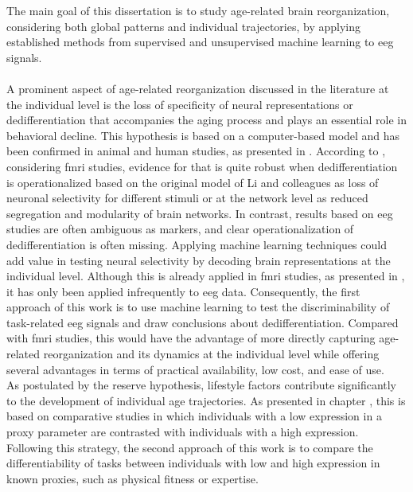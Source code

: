 The main goal of this dissertation is to study age-related brain reorganization, considering both global patterns and individual trajectories, by applying established methods from supervised and unsupervised machine learning to \gls{eeg} signals.\\
\\
A prominent aspect of age-related reorganization discussed in the literature at the individual level is the loss of specificity of neural representations or dedifferentiation that accompanies the aging process and plays an essential role in behavioral decline. This hypothesis is based on a computer-based model and has been confirmed in animal and human studies, as presented in . According to \citeauthor{Koen2019}, considering \gls{fmri} studies, evidence for that is quite robust when dedifferentiation is operationalized based on the original model of Li and colleagues \cite{Li2001,Li2002} as loss of neuronal selectivity for different stimuli or at the network level as reduced segregation and modularity of brain networks. In contrast, results based on \gls{eeg} studies are often ambiguous as markers, and clear operationalization of dedifferentiation is often missing. Applying machine learning techniques could add value in testing neural selectivity by decoding brain representations at the individual level. Although this is already applied in \gls{fmri} studies, as presented in , it has only been applied infrequently to \gls{eeg} data. Consequently, the first approach of this work is to use machine learning to test the discriminability of task-related \gls{eeg} signals and draw conclusions about dedifferentiation. Compared with \gls{fmri} studies, this would have the advantage of more directly capturing age-related reorganization and its dynamics at the individual level while offering several advantages in terms of practical availability, low cost, and ease of use.\\
As postulated by the reserve hypothesis, lifestyle factors contribute significantly to the development of individual age trajectories. As presented in chapter , this is based on comparative studies in which individuals with a low expression in a proxy parameter are contrasted with individuals with a high expression. Following this strategy, the second approach of this work is to compare the differentiability of tasks between individuals with low and high expression in known proxies, such as physical fitness or expertise.\\

